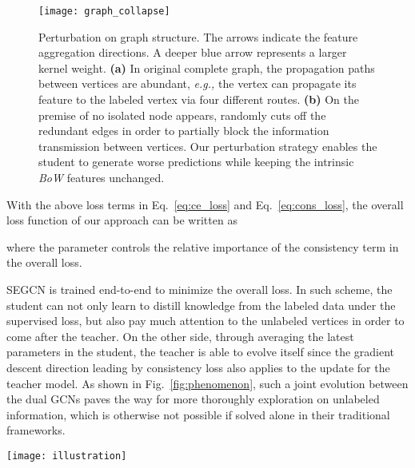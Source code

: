 \documentclass[letterpaper]{article} \usepackage{aaai19}  \usepackage{times}  \usepackage{helvet}  \usepackage{courier}  \usepackage{url}  \usepackage{graphicx}  \usepackage{algorithm}
\begin{document}
\begin{figure}
\centering
\texttt{[image: graph\_collapse]}
\caption{Perturbation on graph structure. The arrows indicate the feature aggregation directions. A deeper blue arrow represents a larger kernel weight. \textbf{(a)} In original complete graph, the propagation paths between vertices are abundant, \emph{e.g.,} the vertex  can propagate its feature to the labeled vertex  via four different routes. \textbf{(b)} On the premise of no isolated node appears,  randomly cuts off the redundant edges in order to partially block the information transmission between vertices. Our perturbation strategy enables the student to generate worse predictions while keeping the intrinsic \emph{BoW} features unchanged.}
\label{fig:perturbation}
\end{figure}



\newline
With the above loss terms in Eq.~\ref{eq:ce_loss} and Eq.~\ref{eq:cons_loss}, the overall loss function of our approach can be written as
\newline

\newline
where the parameter  controls the relative importance of the consistency term in the overall loss.

SEGCN is trained end-to-end to minimize the overall loss. In such scheme, the student can not only learn to distill knowledge from the labeled data under the supervised loss, but also pay much attention to the unlabeled vertices in order to come after the teacher. On the other side, through averaging the latest parameters in the student, the teacher is able to evolve itself since the gradient descent direction leading by consistency loss also applies to the update for the teacher model. As shown in Fig.~\ref{fig:phenomenon}, such a joint evolution between the dual GCNs paves the way for more thoroughly exploration on unlabeled information, which is otherwise not possible if solved alone in their traditional frameworks. 

\begin{figure*}[ht]
\centering
\texttt{[image: illustration]}
\caption{(Best viewed in color.) \textbf{(a)} Vanilla GCN pushes decision boundaries away from the labeled sample. Since the labeled feature is mainly aggregated from adjacent vertices, the near samples can be well classified. However, a remote unlabeled node (red circle) is prone to be ignored by assigning a very small GCN kernel weight. Consequently, the vanilla model may be under-constrained and cannot be well adapted to these distant samples. \textbf{(b)} SEGCN pays more attentions on the unlabeled nodes than vanilla GCN. Via a mutual-promoting process leading by the consistency losses (\emph{e.g.,} the inconsistency between the solid/dotted red circles), SEGCN gives the chances to the unlabeled nodes as well to backpropagate effective gradient to train the model. Once the mutual-promoting process converges, even a remote unlabeled node can be well classified.}
\label{fig:phenomenon}
\end{figure*}
\end{document}
